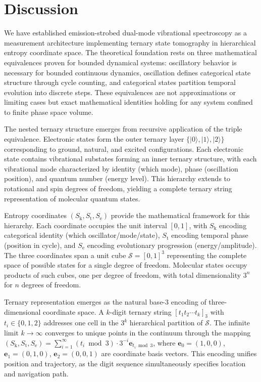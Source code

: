 \documentclass[twocolumn,10pt]{article}
\newcommand{\Sk}{S_{\text{k}}}
\newcommand{\St}{S_{\text{t}}}
\newcommand{\Se}{S_{\text{e}}}
\newcommand{\Sspace}{\mathcal{S}}
\begin{document}
\section{Discussion}

We have established emission-strobed dual-mode vibrational spectroscopy as a measurement architecture implementing ternary state tomography in hierarchical entropy coordinate space. The theoretical foundation rests on three mathematical equivalences proven for bounded dynamical systems: oscillatory behavior is necessary for bounded continuous dynamics, oscillation defines categorical state structure through cycle counting, and categorical states partition temporal evolution into discrete steps. These equivalences are not approximations or limiting cases but exact mathematical identities holding for any system confined to finite phase space volume.

The nested ternary structure emerges from recursive application of the triple equivalence. Electronic states form the outer ternary layer $\{|0\rangle, |1\rangle, |2\rangle\}$ corresponding to ground, natural, and excited configurations. Each electronic state contains vibrational substates forming an inner ternary structure, with each vibrational mode characterized by identity (which mode), phase (oscillation position), and quantum number (energy level). This hierarchy extends to rotational and spin degrees of freedom, yielding a complete ternary string representation of molecular quantum states.

Entropy coordinates $(\Sk, \St, \Se)$ provide the mathematical framework for this hierarchy. Each coordinate occupies the unit interval $[0,1]$, with $\Sk$ encoding categorical identity (which oscillator/mode/state), $\St$ encoding temporal phase (position in cycle), and $\Se$ encoding evolutionary progression (energy/amplitude). The three coordinates span a unit cube $\Sspace = [0,1]^3$ representing the complete space of possible states for a single degree of freedom. Molecular states occupy products of such cubes, one per degree of freedom, with total dimensionality $3^n$ for $n$ degrees of freedom.

Ternary representation emerges as the natural base-3 encoding of three-dimensional coordinate space. A $k$-digit ternary string $[t_1 t_2 \cdots t_k]_3$ with $t_i \in \{0,1,2\}$ addresses one cell in the $3^k$ hierarchical partition of $\Sspace$. The infinite limit $k \to \infty$ converges to unique points in the continuum through the mapping $(\Sk, \St, \Se) = \sum_{i=1}^\infty (t_i \bmod 3) \cdot 3^{-i} \mathbf{e}_{t_i \bmod 3}$, where $\mathbf{e}_0 = (1,0,0)$, $\mathbf{e}_1 = (0,1,0)$, $\mathbf{e}_2 = (0,0,1)$ are coordinate basis vectors. This encoding unifies position and trajectory, as the digit sequence simultaneously specifies location and navigation path.
\end{document}
